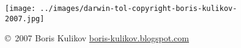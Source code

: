 \begin{frame}[t]
\begin{columns}[c]
\begin{minipage}[c][\headlessframetextheight][c]{\columnwidth}
\begin{center}
        \end{center}
        \end{minipage}


        \begin{minipage}[t][\headlessframetextheight][b]{\columnwidth}
            \begin{figure}
                \begin{center}
                    \texttt{[image: ../images/darwin-tol-copyright-boris-kulikov-2007.jpg]}
                    \vspace{-1.0mm}
                    \caption{\tiny \copyright~2007 Boris Kulikov \href{https://boris-kulikov.blogspot.com/}{boris-kulikov.blogspot.com}}
                \end{center}
            \end{figure}
        \end{minipage}

    \end{columns}

\end{frame}
